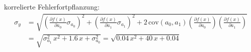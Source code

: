 korrelierte Fehlerfortpflanzung:
\begin{align*}
  \sigma_y &= \sqrt{\left(\frac{\partial f(x)}{\partial a_0} \sigma_{a_0} \right)^2 + \left(\frac{\partial f(x)}{\partial a_1} \sigma_{a_1} \right)^2 + 2\, \text{cov}(a_0, a_1) \left(\frac{\partial f(x)}{\partial a_0}\right) \left(\frac{\partial f(x)}{\partial a_1}\right)} \\
  &= \sqrt{\sigma_{a_1}^2\,x^2 + 1.6\,x + \sigma_{a_0}^2} = \sqrt{0.04\,x^2 + 40\,x + 0.04}
\end{align*}
